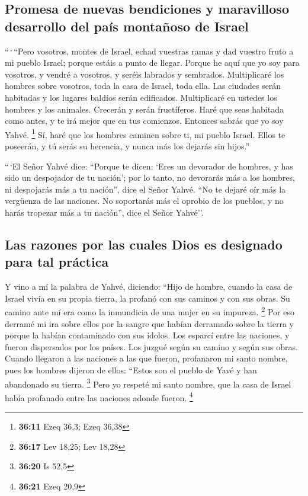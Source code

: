\begin{paracol}{2}
\hypertarget{promesa-de-nuevas-bendiciones-y-maravilloso-desarrollo-del-pauxeds-montauxf1oso-de-israel}{%
\subsection{Promesa de nuevas bendiciones y maravilloso desarrollo del
país montañoso de
Israel}\label{promesa-de-nuevas-bendiciones-y-maravilloso-desarrollo-del-pauxeds-montauxf1oso-de-israel}}

 ``\,`\,``Pero vosotros, montes de Israel, echad vuestras
ramas y dad vuestro fruto a mi pueblo Israel; porque estáis a punto de
llegar.  Porque he aquí que yo soy para vosotros, y vendré
a vosotros, y seréis labrados y sembrados.  Multiplicaré
los hombres sobre vosotros, toda la casa de Israel, toda ella. Las
ciudades serán habitadas y los lugares baldíos serán edificados.
 Multiplicaré en ustedes los hombres y los animales.
Crecerán y serán fructíferos. Haré que seas habitada como antes, y te
irá mejor que en tus comienzos. Entonces sabrás que yo soy Yahvé.
\footnote{\textbf{36:11} Ezeq 36,3; Ezeq 36,38}  Sí, haré
que los hombres caminen sobre ti, mi pueblo Israel. Ellos te poseerán, y
tú serás su herencia, y nunca más los dejarás sin hijos.''

 ``\,`El Señor Yahvé dice: ``Porque te dicen: `Eres un
devorador de hombres, y has sido un despojador de tu nación';
 por lo tanto, no devorarás más a los hombres, ni
despojarás más a tu nación'', dice el Señor Yahvé.  ``No
te dejaré oír más la vergüenza de las naciones. No soportarás más el
oprobio de los pueblos, y no harás tropezar más a tu nación'', dice el
Señor Yahvé''.

\hypertarget{las-razones-por-las-cuales-dios-es-designado-para-tal-pruxe1ctica}{%
\subsection{Las razones por las cuales Dios es designado para tal
práctica}\label{las-razones-por-las-cuales-dios-es-designado-para-tal-pruxe1ctica}}

 Y vino a mí la palabra de Yahvé, diciendo:
 ``Hijo de hombre, cuando la casa de Israel vivía en su
propia tierra, la profanó con sus caminos y con sus obras. Su camino
ante mí era como la inmundicia de una mujer en su impureza. \footnote{\textbf{36:17}
  Lev 18,25; Lev 18,28}  Por eso derramé mi ira sobre
ellos por la sangre que habían derramado sobre la tierra y porque la
habían contaminado con sus ídolos.  Los esparcí entre las
naciones, y fueron dispersados por los países. Los juzgué según su
camino y según sus obras.  Cuando llegaron a las naciones
a las que fueron, profanaron mi santo nombre, pues los hombres dijeron
de ellos: ``Estos son el pueblo de Yavé y han abandonado su tierra.
\footnote{\textbf{36:20} Is 52,5}  Pero yo respeté mi
santo nombre, que la casa de Israel había profanado entre las naciones
adonde fueron. \footnote{\textbf{36:21} Ezeq 20,9}


\end{paracol}
